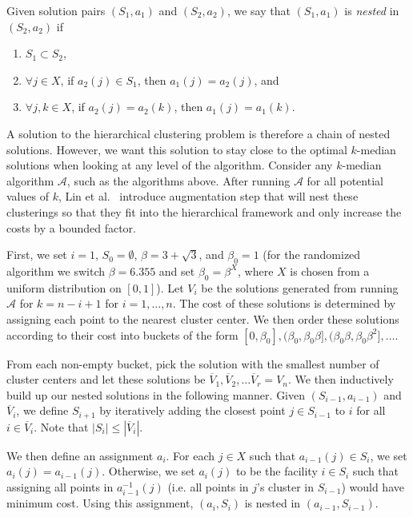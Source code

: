 \documentclass{article}
\begin{document}
Given solution pairs $(S_1, a_1)$ and $(S_2, a_2)$, we say that $(S_1, a_1)$ is \emph{nested} in $(S_2, a_2)$ if 
\begin{enumerate}
\item $S_1 \subset S_2$, 
\item  $\forall  j \in X$, if $a_2(j) \in S_1$, then $a_1(j) = a_2(j)$, and 
\item $\forall j, k \in X$, if $a_2(j) = a_2(k)$, then $a_1(j) = a_1(k)$.
\end{enumerate}
 A solution to the hierarchical clustering problem is therefore a chain of nested solutions. However, we want this solution to stay close to the optimal $k$-median solutions when looking at any level of the algorithm.  
Consider any $k$-median algorithm $\mathcal{A}$, such as the algorithms above. After running $\mathcal{A}$ for all potential values of $k$, Lin et al.~\cite{Lin} introduce  augmentation step that will nest these clusterings so that they fit into the hierarchical framework and only increase the costs by a bounded factor. 

First, we set $i=1$, $S_0 = \emptyset$, $\beta = 3+\sqrt{3}$, and $\beta_0 = 1$ (for the randomized algorithm we switch $\beta = 6.355$ and set $\beta_0 = \beta^X$, where $X$ is chosen from a uniform distribution on $[0,1]$). Let $V_i$ be the solutions generated from running $\mathcal{A}$ for $k=n-i+1$ for $i=1, \ldots, n$. The cost of these solutions is determined by assigning each point to the nearest cluster center. We then order these solutions according to their cost into buckets of the form $[0,\beta_0], (\beta_0, \beta_0 \beta], (\beta_0 \beta, \beta_0 \beta^2], \ldots $. 

From each non-empty bucket, pick the solution with the smallest number of cluster centers and let these solutions be $\overline{V}_1, \overline{V}_2, \ldots \overline{V}_r = V_n$. We then inductively build up our nested solutions in the following manner. Given $(S_{i-1}, a_{i-1})$ and $\overline{V}_i$, we define $S_{i+1}$ by iteratively adding the closest point $j \in S_{i-1}$ to $i$ for all $i \in \overline{V}_i$. Note that $|S_{i}| \leq |\overline{V}_i|$. 

We then define an assignment $a_i$. For each $j \in X$ such that $a_{i-1}(j) \in S_{i}$, we set $a_i(j) = a_{i-1}(j)$. Otherwise, we set $a_i(j)$ to be the facility $i \in S_i$ such that assigning all points in $a_{i-1}^{-1}(j)$ (i.e. all points in $j$'s cluster in $S_{i-1}$) would have minimum cost. Using this assignment, $(a_i, S_i)$ is nested in $(a_{i-1}, S_{i-1})$. 
\end{document}
